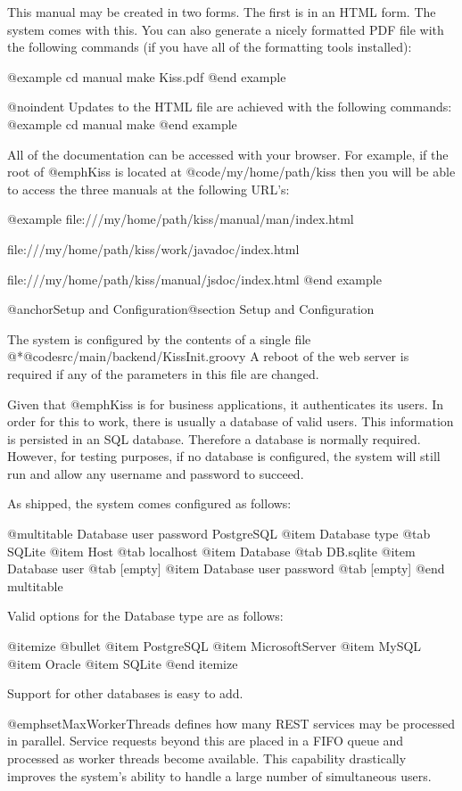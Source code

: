 This manual may be created in two forms.  The first is in an HTML
form.  The system comes with this.  You can also generate a nicely
formatted PDF file with the following commands (if you have all of the
formatting tools installed):

@example
cd manual
make Kiss.pdf
@end example

@noindent
Updates to the HTML file are achieved with the following commands:
@example
cd manual
make
@end example

All of the documentation can be accessed with your browser.  For
example, if the root of @emph{Kiss} is located at
@code{/my/home/path/kiss} then you will be able to access the three
manuals at the following URL's:

@example
file:///my/home/path/kiss/manual/man/index.html

file:///my/home/path/kiss/work/javadoc/index.html

file:///my/home/path/kiss/manual/jsdoc/index.html
@end example

@anchor{Setup and Configuration}@section Setup and Configuration

The system is configured by the contents of a single file
@*@code{src/main/backend/KissInit.groovy} A reboot of the web server
is required if any of the parameters in this file are changed.

Given that @emph{Kiss} is for business applications, it authenticates its
users.  In order for this to work, there is usually a database of valid
users.  This information is persisted in an SQL database.  Therefore a
database is normally required.  However, for testing purposes, if no
database is configured, the system will still run and allow any
username and password to succeed.

As shipped, the system comes configured as follows:

@multitable {Database user password} {PostgreSQL} 
@item Database type
@tab SQLite
@item Host
@tab localhost
@item Database
@tab DB.sqlite
@item Database user
@tab [empty]
@item Database user password
@tab [empty]
@end multitable

Valid options for the Database type are as follows:

@itemize @bullet
@item
PostgreSQL
@item
MicrosoftServer
@item
MySQL
@item
Oracle
@item
SQLite
@end itemize

Support for other databases is easy to add.

@emph{setMaxWorkerThreads} defines how many REST services may be
processed in parallel.  Service requests beyond this are placed in a
FIFO queue and processed as worker threads become available.  This
capability drastically improves the system's ability to handle a large
number of simultaneous users.


